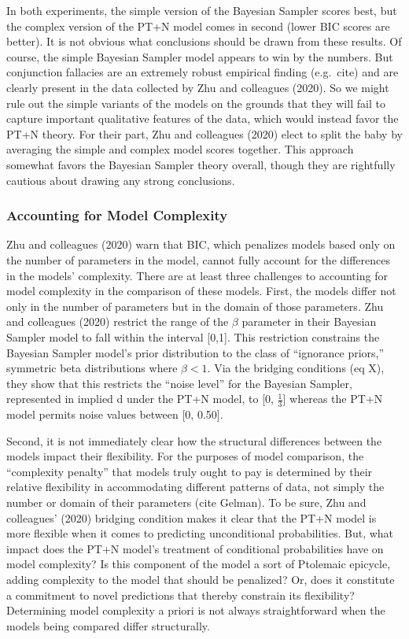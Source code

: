 \documentclass{article}
\begin{document}
In both experiments, the simple version of the Bayesian Sampler scores
best, but the complex version of the PT+N model comes in second (lower
BIC scores are better). It is not obvious what conclusions should be
drawn from these results. Of course, the simple Bayesian Sampler model
appears to win by the numbers. But conjunction fallacies are an
extremely robust empirical finding (e.g.~cite) and are clearly present
in the data collected by Zhu and colleagues (2020). So we might rule out
the simple variants of the models on the grounds that they will fail to
capture important qualitative features of the data, which would instead
favor the PT+N theory. For their part, Zhu and colleagues (2020) elect
to split the baby by averaging the simple and complex model scores
together. This approach somewhat favors the Bayesian Sampler theory
overall, though they are rightfully cautious about drawing any strong
conclusions.

\hypertarget{accounting-for-model-complexity}{%
\subsubsection{Accounting for Model
Complexity}\label{accounting-for-model-complexity}}

Zhu and colleagues (2020) warn that BIC, which penalizes models based
only on the number of parameters in the model, cannot fully account for
the differences in the models' complexity. There are at least three
challenges to accounting for model complexity in the comparison of these
models. First, the models differ not only in the number of parameters
but in the domain of those parameters. Zhu and colleagues (2020)
restrict the range of the \(\beta\) parameter in their Bayesian Sampler
model to fall within the interval {[}0,1{]}. This restriction constrains
the Bayesian Sampler model's prior distribution to the class of
``ignorance priors,'' symmetric beta distributions where \(\beta < 1\).
Via the bridging conditions (eq X), they show that this restricts the
``noise level'' for the Bayesian Sampler, represented in implied d under
the PT+N model, to {[}0, \(\frac{1}{3}\){]} whereas the PT+N model
permits noise values between {[}0, 0.50{]}.

Second, it is not immediately clear how the structural differences
between the models impact their flexibility. For the purposes of model
comparison, the ``complexity penalty'' that models truly ought to pay is
determined by their relative flexibility in accommodating different
patterns of data, not simply the number or domain of their parameters
(cite Gelman). To be sure, Zhu and colleagues' (2020) bridging condition
makes it clear that the PT+N model is more flexible when it comes to
predicting unconditional probabilities. But, what impact does the PT+N
model's treatment of conditional probabilities have on model complexity?
Is this component of the model a sort of Ptolemaic epicycle, adding
complexity to the model that should be penalized? Or, does it constitute
a commitment to novel predictions that thereby constrain its
flexibility? Determining model complexity a priori is not always
straightforward when the models being compared differ structurally.
\end{document}
